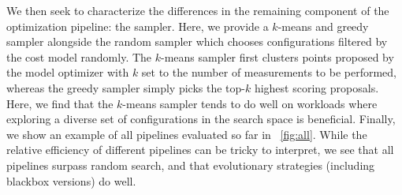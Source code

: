 We then seek to characterize the differences in the remaining component of the optimization pipeline: the sampler.
Here, we provide a $k$-means and greedy sampler alongside the random sampler which chooses configurations filtered by the cost model randomly.
The $k$-means sampler first clusters points proposed by the model optimizer with $k$ set to the number of measurements to be performed, whereas the greedy sampler simply picks the top-$k$ highest scoring proposals.
Here, we find that the $k$-means sampler tends to do well on workloads where exploring a diverse set of configurations in the search space is beneficial.
Finally, we show an example of all pipelines evaluated so far in ~\autoref{fig:all}.
While the relative efficiency of different pipelines can be tricky to interpret, we see that all pipelines surpass random search, and that evolutionary strategies (including blackbox versions) do well.







